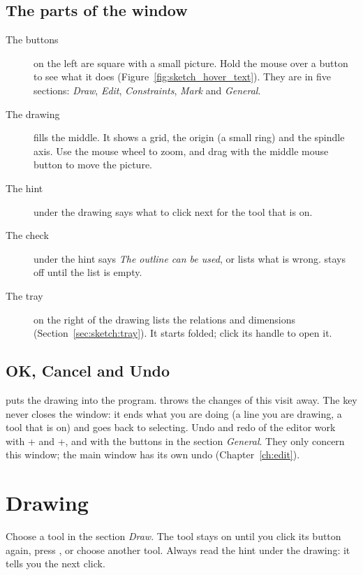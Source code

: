 \subsection{The parts of the window}
\begin{description}
\item[The buttons] on the left are square with a small picture. Hold the mouse over a button to see what it does (Figure~\ref{fig:sketch_hover_text}). They are in five sections: \emph{Draw}, \emph{Edit}, \emph{Constraints}, \emph{Mark} and \emph{General}.
\item[The drawing] fills the middle. It shows a grid, the origin (a small ring) and the spindle axis. Use the mouse wheel to zoom, and drag with the middle mouse button to move the picture.
\item[The hint] under the drawing says what to click next for the tool that is on.
\item[The check] under the hint says \emph{The outline can be used}, or lists what is wrong.  stays off until the list is empty.
\item[The tray] on the right of the drawing lists the relations and dimensions (Section~\ref{sec:sketch:tray}). It starts folded; click its handle to open it.
\end{description}


\subsection{OK, Cancel and Undo}
 puts the drawing into the program.  throws the changes of this visit away. The key  never closes the window: it ends what you are doing (a line you are drawing, a tool that is on) and goes back to selecting. Undo and redo of the editor work with + and +, and with the buttons in the section \emph{General}. They only concern this window; the main window has its own undo (Chapter~\ref{ch:edit}).

\section{Drawing}\label{sec:sketch:draw}

Choose a tool in the section \emph{Draw}. The tool stays on until you click its button again, press , or choose another tool. Always read the hint under the drawing: it tells you the next click.


